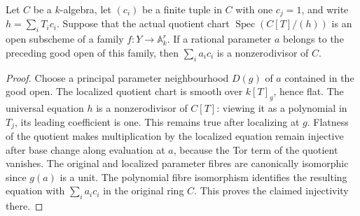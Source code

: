 \begin{lemma}
\label{lem:kn-relative-nadel-bertini-flat-equation}
\leanok
{}
Let $C$ be a $k$-algebra, let $(c_i)$ be a finite tuple in $C$ with one
$c_j=1$, and write $h=\sum_i T_ic_i$.  Suppose that the actual quotient
chart $\operatorname{Spec}(C[T]/(h))$ is an open subscheme of a family
$f:Y\to\mathbb A^r_k$.  If a rational parameter $a$ belongs to the
preceding good open of this family, then $\sum_i a_ic_i$ is a
nonzerodivisor of $C$.
\end{lemma}
\begin{proof}
Choose a principal parameter neighbourhood $D(g)$ of $a$ contained in
the good open.  The localized quotient chart is smooth over $k[T]_g$,
hence flat.  The universal equation $h$ is a nonzerodivisor of $C[T]$:
viewing it as a polynomial in $T_j$, its leading coefficient is one.
This remains true after localizing at $g$.  Flatness of the quotient
makes multiplication by the localized equation remain injective after
base change along evaluation at $a$, because the Tor term of the
quotient vanishes.  The original and localized parameter fibres are
canonically isomorphic since $g(a)$ is a unit.  The polynomial fibre
isomorphism identifies the resulting equation with $\sum_i a_ic_i$ in
the original ring $C$.  This proves the claimed injectivity there.
\end{proof}

